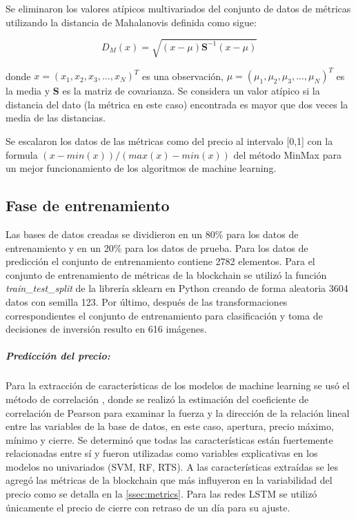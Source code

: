Se eliminaron los valores atípicos multivariados del conjunto de datos de métricas utilizando la distancia de  Mahalanovis definida como sigue:

\[ D_M(x) = \sqrt{(x-\mu)\textbf{S}^{-1}(x-\mu)} \]

donde $x = (x_1,x_2,x_3,...,x_N)^T$ es una observación, $\mu = (\mu_1,\mu_2,\mu_3,...,\mu_N)^T$ es la media y $\textbf{S}$ es la matriz de covarianza. Se considera un valor atípico si la distancia del dato (la métrica en este caso) encontrada es mayor que dos veces la media de las distancias.


Se escalaron los datos de las métricas como del precio al intervalo [0,1] con la formula $(x-min(x))/(max(x)-min(x))$ del método MinMax para un mejor funcionamiento de los algoritmos de machine learning. 	 

\subsection{Fase de entrenamiento}

Las bases de datos creadas se dividieron en un 80\% para los datos de entrenamiento y en un 20\% para los datos de prueba. Para los datos de predicción el conjunto de entrenamiento contiene 2782 elementos. Para el conjunto de entrenamiento de métricas de la blockchain se utilizó la función \emph{train\_test\_split} de la librería sklearn en Python creando de forma aleatoria 3604 datos con semilla 123. Por último, después de las transformaciones correspondientes el conjunto de entrenamiento para clasificación y toma de decisiones de inversión resulto en 616 imágenes.

\subparagraph{Predicción del precio:} Para la extracción de características de los modelos de machine learning se usó el método de correlación \cite{tandonBitcoinPriceForecasting2019}, donde se realizó la estimación del coeficiente de correlación de Pearson para examinar la fuerza y la dirección de la relación lineal entre las variables de la base de datos, en este caso, apertura, precio máximo, mínimo y cierre. Se determinó que todas las características están fuertemente relacionadas entre sí y fueron utilizadas como variables explicativas en los modelos no univariados (SVM, RF, RTS). A las características extraídas se les agregó las métricas de la blockchain que más influyeron en la variabilidad del precio como se detalla en la \autoref{ssec:metrics}.    
Para las redes LSTM se utilizó únicamente el precio de cierre con retraso de un día para su ajuste.

